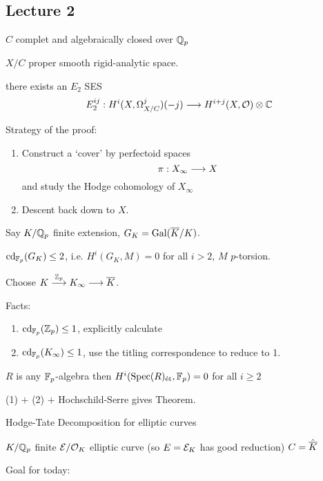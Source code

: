 \newpage
\subsection{Lecture 2}

$C$ complet and algebraically closed over $\mathbb{Q}_p$

$X/C$ proper smooth rigid-analytic space. 

there exists an $E_2$ SES
	\[
	E_2^{ij}: H^i(X,\Omega^j_{X/C})(-j) \stackrel{}{\longrightarrow} H^{i+j}(X,\mathcal{O}) \otimes \mathbb{C}
	\]


Strategy of the proof:

\begin{enumerate}[1.]
\item Construct a `cover' by perfectoid spaces
	\[
	\pi: X_\infty \stackrel{}{\longrightarrow} X
	\]
and study the Hodge cohomology of $X_\infty$

\item Descent back down to $X$. 
\end{enumerate}

\begin{ex}
Say $K/\mathbb{Q}_p$ finite extension, $G_K= \operatorname{Gal}(\overline{K}/K)$.
\end{ex}

\begin{thm}
$\operatorname{cd}_{\mathbb{F}_p}(G_K) \leq 2$, i.e. $H^i(G_K,M)=0$ for all $i>2$, $M$ $p$-torsion. 
\end{thm}

\pfsk Choose $K \stackrel{\mathbb{Z}_p}{\longrightarrow} K_\infty \stackrel{}{\longrightarrow} \overline{K}$. 


Facts:

\begin{enumerate}[1.]
\item $\operatorname{cd}_{\mathbb{F}_p}(\mathbb{Z}_p) \leq 1$, explicitly calculate
\item $\operatorname{cd}_{\mathbb{F}_p}(K_\infty) \leq 1$, use the titling correspondence to reduce to 1.
\end{enumerate}


\begin{prop}
$R$ is any $\mathbb{F}_p$-algebra then $H^i(\operatorname{Spec}(R)_{\text{\'et}}, \mathbb{F}_p)= 0$ for all $i \geq 2$
\end{prop}

(1) $+$ (2) $+$ Hochschild-Serre gives Theorem.


Hodge-Tate Decomposition for elliptic curves

$K/\mathbb{Q}_p$ finite
$\mathcal{E}/\mathcal{O}_K$ elliptic curve (so $E= \mathcal{E}_K$ has good reduction)
$C= \hat{\overline{K}}$

Goal for today:

